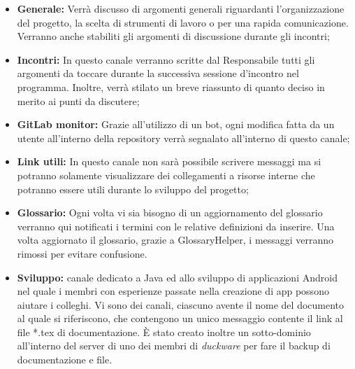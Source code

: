\begin{itemize}
    \item \textbf{Generale: }Verrà discusso di argomenti generali riguardanti l’organizzazione del progetto, la scelta di strumenti di lavoro o per una rapida comunicazione. Verranno anche stabiliti gli argomenti di discussione durante gli incontri;
    \item \textbf{Incontri: }In questo canale verranno scritte dal Responsabile tutti gli argomenti da toccare durante la successiva sessione d’incontro nel programma. Inoltre, verrà stilato un breve riassunto di quanto deciso in merito ai punti da discutere;
    \item \textbf{GitLab monitor: }Grazie all’utilizzo di un bot, ogni modifica fatta da un utente all’interno della repository verrà segnalato all’interno di questo canale;
    \item \textbf{Link utili: }In questo canale non sarà possibile scrivere messaggi ma si potranno solamente visualizzare dei collegamenti a risorse interne che potranno essere utili durante lo sviluppo del progetto;
    \item \textbf{Glossario: }Ogni volta vi sia bisogno di un aggiornamento del glossario verranno qui notificati i termini con le relative definizioni da inserire. Una volta aggiornato il glossario, grazie a GlossaryHelper, i messaggi verranno rimossi per evitare confusione.
    \item \textbf{Sviluppo: } canale dedicato a Java ed allo sviluppo di applicazioni Android nel quale i membri con esperienze passate nella creazione di app possono aiutare i colleghi.
Vi sono dei canali, ciascuno avente il nome del documento al quale si riferiscono, che contengono un unico messaggio contente il link al file *.tex di documentazione. È stato creato inoltre un sotto-dominio all’interno del server di uno dei membri di \emph{duckware} per fare il backup di documentazione e file.
\end{itemize}
